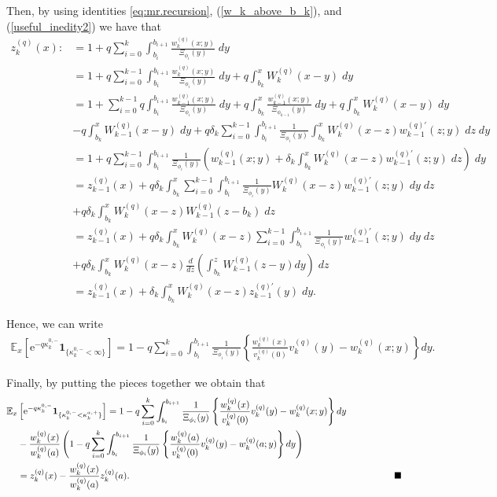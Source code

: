 \documentclass[12pt,reqno]{amsart}
\newcommand{\red}{\textcolor[rgb]{1.00,0.00,0.00}}
\theoremstyle{definition}
\theoremstyle{remark}
\newcommand{\e}{\mathbb{E}}
\newcommand{\ind}{\mathbf{1}}
\begin{document}
Then, by using identities \eqref{eq:mr.recursion}, (\ref{w_k_above_b_k}), and (\ref{useful_inedity2}) we have that
\begin{align*}
z^{(q)}_k(x):&= 1+q\sum_{i=0}^k \int_{b_i}^{b_{i+1}}\frac{w_k^{(q)}(x;y)}{\Xi_{\phi_i}(y)}\;dy
\\&=1+q\sum_{i=0}^{k-1} \int_{b_i}^{b_{i+1}}\frac{w_k^{(q)}(x;y)}{\Xi_{\phi_i}(y)}\;dy+q\int_{b_k}^{x}W_k^{(q)}(x-y)\;dy\\
&=1+\sum_{i=0}^{k-1} q\int_{b_i}^{b_{i+1}}\frac{w_{k-1}^{(q)}(x;y)}{\Xi_{\phi_i}(y)}\;dy + q 
\int_{b_k}^{x}\frac{w_{k-1}^{(q)}(x;y)}{\Xi_{\phi_{k-1}}(y)}\;dy +q\int_{b_k}^{x}W_k^{(q)}(x-y)\;dy\\
&- q\int_{b_k}^{x}W_{k-1}^{(q)}(x-y) \;dy 
+ q \delta_k\sum_{i=0}^{k-1} \int_{b_i}^{b_{i+1}} \frac{1}{\Xi_{\phi_i}(y)}
\int_{b_k}^{x} W_k^{(q)}(x-z)w_{k-1}^{(q)\prime}(z;y)\;dz\;dy\\
&=1+q\sum_{i=0}^{k-1} \int_{b_i}^{b_{i+1}}\frac{1}{\Xi_{\phi_i}(y)}\left(w^{(q)}_{k-1}(x;y)+
\delta_k\int_{b_k}^xW_k^{(q)}(x-z)w_{k-1}^{(q)\prime}(z;y)\;dz\right)\;dy\\
&=z_{k-1}^{(q)}(x)+q\delta_k \int_{b_k}^x \sum_{i=0}^{k-1}\int_{b_i}^{b_{i+1}} \frac{1}{\Xi_{\phi_i}(y)} W_k^{(q)}(x-z)w_{k-1}^{(q)\prime}(z;y)\;dy\; dz\\
&+q\delta_k\int_{b_k}^{x}W_k^{(q)}(x-z)W_{k-1}^{(q)}(z-b_k)\;dz\\
&=z_{k-1}^{(q)}(x)+q\delta_k \int_{b_k}^x  W_k^{(q)}(x-z) \sum_{i=0}^{k-1} \int_{b_i}^{b_{i+1}}\frac{1}{\Xi_{\phi_i}(y)} w_{k-1}^{(q)\prime}(z;y)\;dy\; dz\\
&+q\delta_k\int_{b_k}^{x}W_k^{(q)}(x-z)\frac{d}{dz}\left(\int_{b_k}^{z} W_{k-1}^{(q)}(z-y)dy\right)\;dz\\
&=z_{k-1}^{(q)}(x)+\delta_k\int_{b_k}^xW_k^{(q)}(x-z)z_{k-1}^{(q)\prime}(y)\;dy. 
\end{align*}

Hence, we can write
\begin{align*}
\e_x \left[ \mathrm{e}^{-q \kappa_k^{0,-}} \ind_{\{\kappa_k^{0,-}<\infty\}} \right]=
1-q\sum_{i=0}^k  \int_{b_i}^{b_{i+1}} \frac{1}{\Xi_{\phi_i}(y)} \left\{\frac{w_k^{(q)}(x)}{v_k^{(q)}(0)}v_k^{(q)}(y)-w_k^{(q)}(x;y)\right\}dy.
\end{align*}


\par Finally, by putting the pieces together we obtain that
\begin{align*}
\e_x &\left[ \mathrm{e}^{-q \kappa_k^{0,-}} \ind_{\{\kappa_k^{0,-}<\kappa_k^{a,+}\}} \right]=1-q\sum_{i=0}^k
 \int_{b_i}^{b_{i+1}} \frac{1}{\Xi_{\phi_i}(y)}\left\{\frac{w_k^{(q)}(x)}{v_k^{(q)}(0)}v_k^{(q)}(y)-w_k^{(q)}(x;y)\right\}dy\\
&-\frac{w_k^{(q)}(x)}{w_k^{(q)}(a)}\left(1-q\sum_{i=0}^k\int_{b_i}^{b_{i+1}}\frac{1}{\Xi_{\phi_i}(y)}\left\{
\frac{w_k^{(q)}(a)}{v_k^{(q)}(0)}v_k^{(q)}(y)-w_k^{(q)}(a;y)\right\}dy\right)\\
&=z_k^{(q)}(x)-\frac{w_k^{(q)}(x)}{w_k^{(q)}(a)}z_k^{(q)}(a). \textrm{\hspace{10cm}} \blacksquare
\end{align*}
\end{document}
